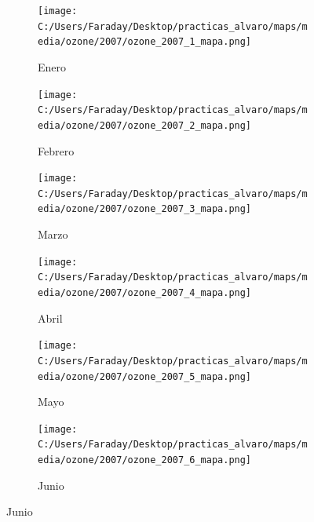 \documentclass[12pt]{article}
\begin{document}
\begin{figure}[H]
\centering
\begin{subfigure}[H]{0.15\textwidth}
\texttt{[image: C:/Users/Faraday/Desktop/practicas\_alvaro/maps/media/ozone/2007/ozone\_2007\_1\_mapa.png]}
\captionsetup{labelformat=empty}
\caption{Enero}
\label{fig:map-ozone-2007-1}
\end{subfigure}
%
\begin{subfigure}[H]{0.15\textwidth}
\texttt{[image: C:/Users/Faraday/Desktop/practicas\_alvaro/maps/media/ozone/2007/ozone\_2007\_2\_mapa.png]}
\captionsetup{labelformat=empty}
\caption{Febrero}
\label{fig:map-ozone-2007-2}
\end{subfigure}
%
\begin{subfigure}[H]{0.15\textwidth}
\texttt{[image: C:/Users/Faraday/Desktop/practicas\_alvaro/maps/media/ozone/2007/ozone\_2007\_3\_mapa.png]}
\captionsetup{labelformat=empty}
\caption{Marzo}
\label{fig:map-ozone-2007-3}
\end{subfigure}
%
\begin{subfigure}[H]{0.15\textwidth}
\texttt{[image: C:/Users/Faraday/Desktop/practicas\_alvaro/maps/media/ozone/2007/ozone\_2007\_4\_mapa.png]}
\captionsetup{labelformat=empty}
\caption{Abril}
\label{fig:map-ozone-2007-4}
\end{subfigure}
%
\begin{subfigure}[H]{0.15\textwidth}
\texttt{[image: C:/Users/Faraday/Desktop/practicas\_alvaro/maps/media/ozone/2007/ozone\_2007\_5\_mapa.png]}
\captionsetup{labelformat=empty}
\caption{Mayo}
\label{fig:map-ozone-2007-5}
\end{subfigure}
%
\begin{subfigure}[H]{0.15\textwidth}
\texttt{[image: C:/Users/Faraday/Desktop/practicas\_alvaro/maps/media/ozone/2007/ozone\_2007\_6\_mapa.png]}
\captionsetup{labelformat=empty}
\caption{Junio}
\label{fig:map-ozone-2007-6}
\end{subfigure}


\end{figure}
\end{document}

